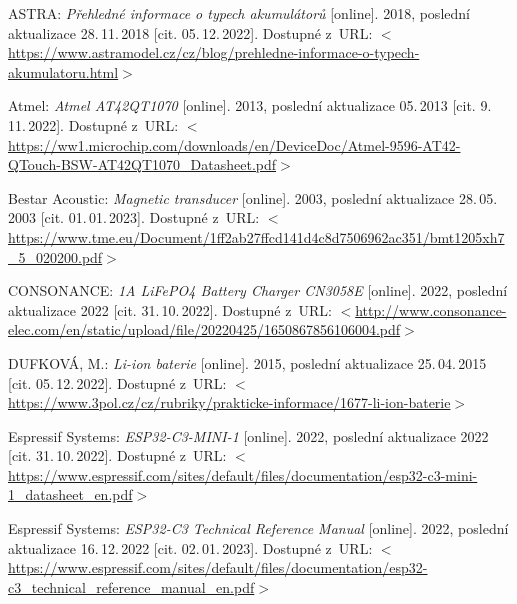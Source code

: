 \begin{thebibliography}{99}

    ASTRA:
    \emph{Přehledné informace o typech akumulátorů}\/ [online].
    2018, poslední aktualizace 28.\,11.\,2018 [cit. 05.\,12.\,2022].
    Dostupné z~URL:
    \(<\)\url{https://www.astramodel.cz/cz/blog/prehledne-informace-o-typech-akumulatoru.html}\(>\)

    Atmel:
    \emph{Atmel AT42QT1070}\/ [online].
    2013, poslední aktualizace 05.\,2013 [cit. 9.\,11.\,2022].
    Dostupné z~URL: 
    \(<\)\url{https://ww1.microchip.com/downloads/en/DeviceDoc/Atmel-9596-AT42-QTouch-BSW-AT42QT1070_Datasheet.pdf}\(>\)

    Bestar Acoustic:
    \emph{Magnetic transducer}\/ [online].
    2003, poslední aktualizace 28.\,05.\,2003 [cit. 01.\,01.\,2023]. 
    Dostupné z~URL:
    \(<\)\url{https://www.tme.eu/Document/1ff2ab27ffcd141d4c8d7506962ac351/bmt1205xh7_5_020200.pdf}\(>\)

    CONSONANCE:
    \emph{1A LiFePO4 Battery Charger CN3058E}\/ [online].
    2022, poslední aktualizace 2022 [cit. 31.\,10.\,2022].
    Dostupné z~URL: %
    \(<\)\url{http://www.consonance-elec.com/en/static/upload/file/20220425/1650867856106004.pdf}\(>\)

    DUFKOVÁ, M.:
    \emph{Li-ion baterie}\/ [online].
    2015, poslední aktualizace 25.\,04.\,2015 [cit. 05.\,12.\,2022].
    Dostupné z~URL:
    \(<\)\url{https://www.3pol.cz/cz/rubriky/prakticke-informace/1677-li-ion-baterie}\(>\)

    Espressif Systems:
    \emph{ESP32-C3-MINI-1}\/ [online].
    2022, poslední aktualizace 2022 [cit. 31.\,10.\,2022].
    Dostupné z~URL:
    \(<\)\url{https://www.espressif.com/sites/default/files/documentation/esp32-c3-mini-1_datasheet_en.pdf}\(>\)

    Espressif Systems:
    \emph{ESP32-C3 Technical Reference Manual}\/ [online].
    2022, poslední aktualizace 16.\,12.\,2022 [cit. 02.\,01.\,2023].
    Dostupné z~URL:
    \(<\)\url{https://www.espressif.com/sites/default/files/documentation/esp32-c3_technical_reference_manual_en.pdf}\(>\)


\end{thebibliography}
